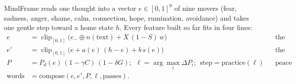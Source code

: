 \documentclass[10pt]{article}
\theoremstyle{remark}
\newcommand{\clip}{\operatorname{clip}_{[0,1]}}
\begin{document}
MindFrame reads one thought into a vector $e\in[0,1]^9$ of nine movers (fear, sadness, anger, shame, calm, connection, hope, rumination, avoidance) and takes one gentle step toward a home state $h$. Every feature built so far fits in four lines:
\begin{align}
e &= \clip\!\big(e_{-} \oplus n(\text{text}) + X\,(1-S)\,w\big) && \text{the reading}\label{eq:read}\\
e' &= \clip\!\big(e + a(e)\,(h-e) + b\,s(e)\big) && \text{the step}\label{eq:step}\\
P &= P_d(e)\,(1-\gamma C)\,(1-\delta G);\ \ \ell=\arg\max_i \Delta P_i;\ \ \text{step}=\text{practice}(\ell) && \text{peace}\label{eq:peace}\\
\text{words} &= \text{compose}(e, e', P, \ell, \text{passes}). && \label{eq:words}
\end{align}
\end{document}
